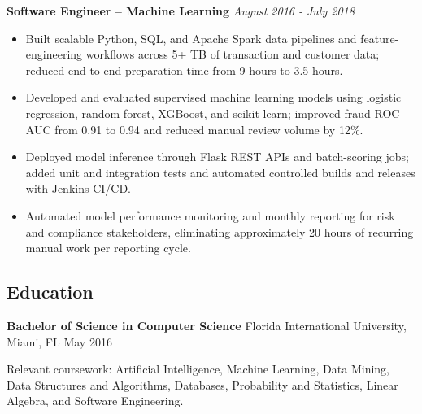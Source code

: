 \documentclass[10pt]{article}
\providecommand{\tightlist}{%
  \setlength{\itemsep}{0pt}\setlength{\parskip}{0pt}}
\begin{document}
\textbf{Software Engineer -- Machine Learning} \textbar{} \emph{August
2016 - July 2018}

\begin{itemize}
\tightlist
\item
  Built scalable Python, SQL, and Apache Spark data pipelines and
  feature-engineering workflows across 5+ TB of transaction and customer
  data; reduced end-to-end preparation time from 9 hours to 3.5 hours.
\item
  Developed and evaluated supervised machine learning models using
  logistic regression, random forest, XGBoost, and scikit-learn;
  improved fraud ROC-AUC from 0.91 to 0.94 and reduced manual review
  volume by 12\%.
\item
  Deployed model inference through Flask REST APIs and batch-scoring
  jobs; added unit and integration tests and automated controlled builds
  and releases with Jenkins CI/CD.
\item
  Automated model performance monitoring and monthly reporting for risk
  and compliance stakeholders, eliminating approximately 20 hours of
  recurring manual work per reporting cycle.
\end{itemize}

\subsection{Education}\label{education}

\textbf{Bachelor of Science in Computer Science} \textbar{} Florida
International University, Miami, FL \textbar{} May 2016

Relevant coursework: Artificial Intelligence, Machine Learning, Data
Mining, Data Structures and Algorithms, Databases, Probability and
Statistics, Linear Algebra, and Software Engineering.
\end{document}
